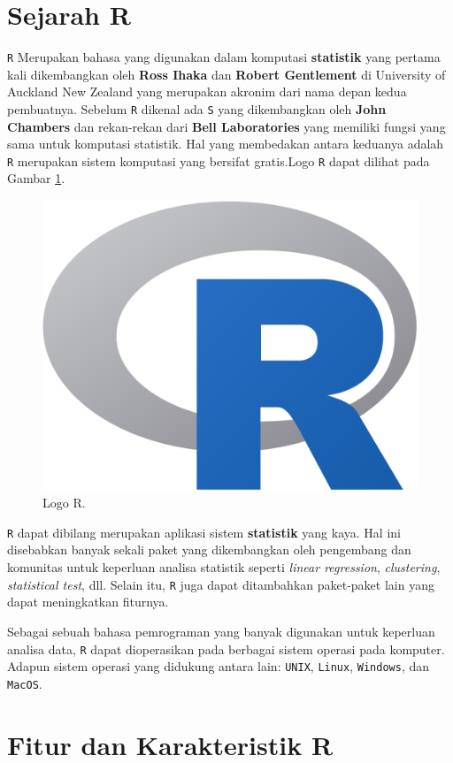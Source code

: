 \documentclass[]{book}
\begin{document}
\section{Sejarah R}\label{sejarah-r}

\texttt{R} Merupakan bahasa yang digunakan dalam komputasi
\textbf{statistik} yang pertama kali dikembangkan oleh \textbf{Ross
Ihaka} dan \textbf{Robert Gentlement} di University of Auckland New
Zealand yang merupakan akronim dari nama depan kedua pembuatnya. Sebelum
\texttt{R} dikenal ada \texttt{S} yang dikembangkan oleh \textbf{John
Chambers} dan rekan-rekan dari \textbf{Bell Laboratories} yang memiliki
fungsi yang sama untuk komputasi statistik. Hal yang membedakan antara
keduanya adalah \texttt{R} merupakan sistem komputasi yang bersifat
gratis.Logo \texttt{R} dapat dilihat pada Gambar \ref{fig:Logo}.

\begin{figure}

{\centering \includegraphics[width=0.4\linewidth]{r-icon} 

}

\caption{Logo R.}\label{fig:Logo}
\end{figure}

\texttt{R} dapat dibilang merupakan aplikasi sistem \textbf{statistik}
yang kaya. Hal ini disebabkan banyak sekali paket yang dikembangkan oleh
pengembang dan komunitas untuk keperluan analisa statistik seperti
\emph{linear regression}, \emph{clustering}, \emph{statistical test},
dll. Selain itu, \texttt{R} juga dapat ditambahkan paket-paket lain yang
dapat meningkatkan fiturnya.

Sebagai sebuah bahasa pemrograman yang banyak digunakan untuk keperluan
analisa data, \texttt{R} dapat dioperasikan pada berbagai sistem operasi
pada komputer. Adapun sistem operasi yang didukung antara lain:
\texttt{UNIX}, \texttt{Linux}, \texttt{Windows}, dan \texttt{MacOS}.

\section{Fitur dan Karakteristik R}\label{fitur-dan-karakteristik-r}
\end{document}
